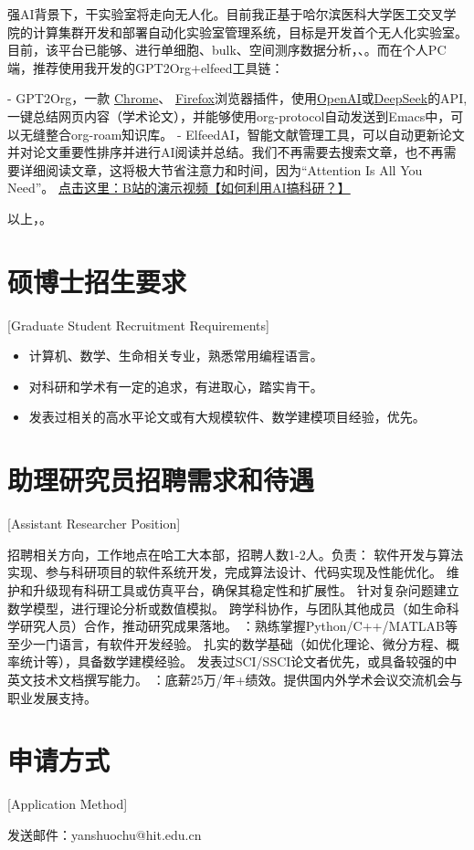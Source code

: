 强AI背景下，干实验室将走向无人化。目前我正基于哈尔滨医科大学医工交叉学院的计算集群开发和部署自动化实验室管理系统，目标是开发首个无人化实验室。目前，该平台已能够、进行单细胞、bulk、空间测序数据分析，、。而在个人PC端，推荐使用我开发的GPT2Org+elfeed工具链：

- GPT2Org，一款
\href{https://chromewebstore.google.com/detail/gpt2org/nedljjoclmlgpobfohcnanjipnblgjbo?pli=1}{\uline{Chrome}}、
\href{https://addons.mozilla.org/en-US/firefox/addon/gpt2org/}{\uline{Firefox}}浏览器插件，使用\href{https://platform.openai.com/api-keys}{\uline{OpenAI}}或\href{https://platform.deepseek.com/api_keys}{\uline{DeepSeek}}的API,一键总结网页内容（学术论文），并能够使用org-protocol自动发送到Emacs中，可以无缝整合org-roam知识库。
- ElfeedAI，智能文献管理工具，可以自动更新论文并对论文重要性排序并进行AI阅读并总结。我们不再需要去搜索文章，也不再需要详细阅读文章，这将极大节省注意力和时间，因为“Attention Is All You Need”。
\href{https://www.bilibili.com/video/BV1dModYPE3c/?share_source=copy_web&vd_source=d6f2f3603fdf3b24c20399fbfd25df0d}{\uline{点击这里：B站的演示视频【如何利用AI搞科研？】}}

以上，。

\section{硕博士招生要求}[Graduate Student Recruitment Requirements]

\begin{itemize}
\item 计算机、数学、生命相关专业，熟悉常用编程语言。
\item 对科研和学术有一定的追求，有进取心，踏实肯干。
\item 发表过相关的高水平论文或有大规模软件、数学建模项目经验，优先。
\end{itemize}

\section{助理研究员招聘需求和待遇}[Assistant Researcher Position]

招聘相关方向，工作地点在哈工大本部，招聘人数1-2人。负责：
软件开发与算法实现、参与科研项目的软件系统开发，完成算法设计、代码实现及性能优化。
维护和升级现有科研工具或仿真平台，确保其稳定性和扩展性。
针对复杂问题建立数学模型，进行理论分析或数值模拟。
跨学科协作，与团队其他成员（如生命科学研究人员）合作，推动研究成果落地。
：熟练掌握Python/C++/MATLAB等至少一门语言，有软件开发经验。
扎实的数学基础（如优化理论、微分方程、概率统计等），具备数学建模经验。
发表过SCI/SSCI论文者优先，或具备较强的中英文技术文档撰写能力。
：底薪25万/年+绩效。提供国内外学术会议交流机会与职业发展支持。

\section{申请方式}[Application Method]

发送邮件：yanshuochu@hit.edu.cn



